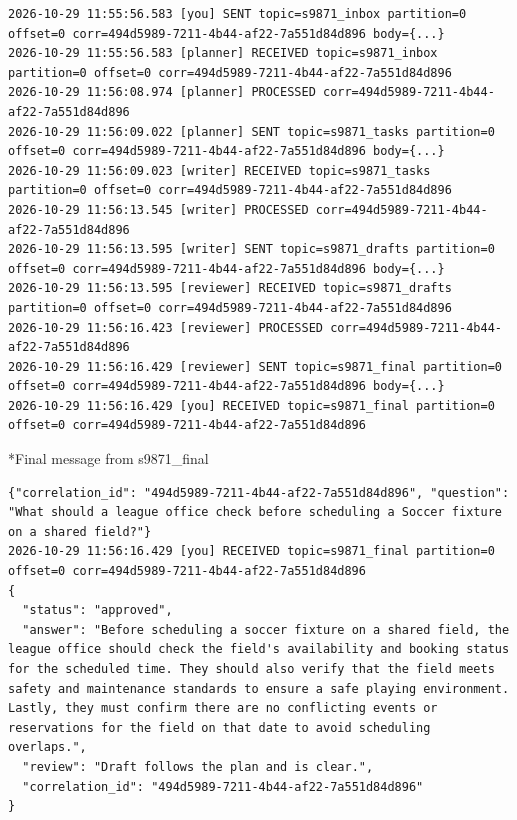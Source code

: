 \documentclass[11pt]{article}
\makeatletter
\renewcommand\subsection{\@startsection{subsection}{2}{\z@}{-2.2ex \@plus -1ex \@minus -.2ex}{0.8ex \@plus.2ex}{\normalfont\fontsize{12}{14.5}\selectfont\bfseries}}
\makeatother
\begin{document}
\begingroup\lstset{basicstyle=\ttfamily\tiny}
\begin{lstlisting}
2026-10-29 11:55:56.583 [you] SENT topic=s9871_inbox partition=0 offset=0 corr=494d5989-7211-4b44-af22-7a551d84d896 body={...}
2026-10-29 11:55:56.583 [planner] RECEIVED topic=s9871_inbox partition=0 offset=0 corr=494d5989-7211-4b44-af22-7a551d84d896
2026-10-29 11:56:08.974 [planner] PROCESSED corr=494d5989-7211-4b44-af22-7a551d84d896
2026-10-29 11:56:09.022 [planner] SENT topic=s9871_tasks partition=0 offset=0 corr=494d5989-7211-4b44-af22-7a551d84d896 body={...}
2026-10-29 11:56:09.023 [writer] RECEIVED topic=s9871_tasks partition=0 offset=0 corr=494d5989-7211-4b44-af22-7a551d84d896
2026-10-29 11:56:13.545 [writer] PROCESSED corr=494d5989-7211-4b44-af22-7a551d84d896
2026-10-29 11:56:13.595 [writer] SENT topic=s9871_drafts partition=0 offset=0 corr=494d5989-7211-4b44-af22-7a551d84d896 body={...}
2026-10-29 11:56:13.595 [reviewer] RECEIVED topic=s9871_drafts partition=0 offset=0 corr=494d5989-7211-4b44-af22-7a551d84d896
2026-10-29 11:56:16.423 [reviewer] PROCESSED corr=494d5989-7211-4b44-af22-7a551d84d896
2026-10-29 11:56:16.429 [reviewer] SENT topic=s9871_final partition=0 offset=0 corr=494d5989-7211-4b44-af22-7a551d84d896 body={...}
2026-10-29 11:56:16.429 [you] RECEIVED topic=s9871_final partition=0 offset=0 corr=494d5989-7211-4b44-af22-7a551d84d896
\end{lstlisting}
\endgroup
\subsection*{Final message from s9871\_final}
\begingroup\lstset{basicstyle=\ttfamily\scriptsize}
\begin{lstlisting}
{"correlation_id": "494d5989-7211-4b44-af22-7a551d84d896", "question": "What should a league office check before scheduling a Soccer fixture on a shared field?"}
2026-10-29 11:56:16.429 [you] RECEIVED topic=s9871_final partition=0 offset=0 corr=494d5989-7211-4b44-af22-7a551d84d896
{
  "status": "approved",
  "answer": "Before scheduling a soccer fixture on a shared field, the league office should check the field's availability and booking status for the scheduled time. They should also verify that the field meets safety and maintenance standards to ensure a safe playing environment. Lastly, they must confirm there are no conflicting events or reservations for the field on that date to avoid scheduling overlaps.",
  "review": "Draft follows the plan and is clear.",
  "correlation_id": "494d5989-7211-4b44-af22-7a551d84d896"
}
\end{lstlisting}
\endgroup
\end{document}
